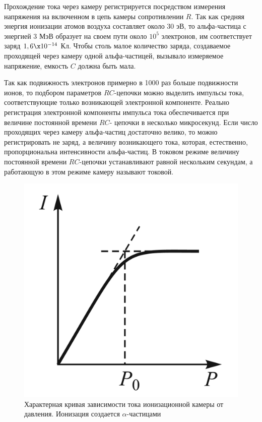 \documentclass[12pt]{kiarticle}
\begin{document}
	Прохождение тока через камеру регистрируется посредством измерения напряжения на включенном в цепь камеры сопротивлении $ R $.
	Так как средняя энергия ионизации атомов воздуха составляет около 30 эВ, то альфа-частица с энергией 3 МэВ образует на своем пути около $ 10^5 $ электронов, им соответствует заряд $1,6 \x 10^{-14} $ Кл. Чтобы
	столь малое количество заряда, создаваемое проходящей через камеру одной альфа-частицей, вызывало измеряемое напряжение, емкость $ C $
	должна быть мала.
	
	Так как подвижность электронов примерно в 1000 раз больше подвижности ионов, то подбором параметров $ RC $-цепочки можно выделить импульсы тока, соответствующие только возникающей электронной компоненте. Реально регистрация электронной компоненты
	импульса тока обеспечивается при величине постоянной времени $ RC $-
	цепочки в несколько микросекунд.
	Если число проходящих через камеру альфа-частиц достаточно велико, то можно регистрировать не заряд, а величину возникающего тока, которая, естественно, пропорциональна интенсивности альфа-частиц. В
	токовом режиме величину постоянной времени $ RC $-цепочки устанавливают равной нескольким секундам, а работающую в этом режиме
	камеру называют токовой.
	
	\begin{figure}
		\includegraphics[width=\linewidth]{PotI}
		\caption{Характерная кривая зависимости
			тока ионизационной камеры от давления.
			Ионизация создается $ \alpha $-частицами}
		\label{ris PotI}
	\end{figure}
	
\end{document}
